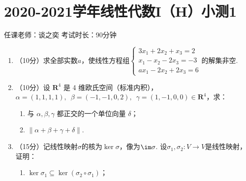 \section{2020-2021学年线性代数I（H）小测1}

\begin{center}
    任课老师：谈之奕\hspace{4em} 考试时长：90分钟
\end{center}

\begin{enumerate}
    \item （10分）求全部实数$a$，使线性方程组$\begin{cases}
        3x_1+2x_2+x_3=2 \\ x_1-x_2-2x_3=-3 \\ ax_1-2x_2+2x_3=6
    \end{cases}$的解集非空.
	\item （10分）设 $\mathbf{R}^4$ 是 4 维欧氏空间（标准内积），$\alpha=(1,1,1,1),\enspace\allowbreak\beta=(-1,-1,0,2),\enspace\allowbreak\gamma=(1,-1,0,0) \in \mathbf{R}^4$，求：
    \begin{enumerate}
        \item 与 $\alpha,\beta,\gamma$ 都正交的一个单位向量 $\delta$；

        \item $\lVert \alpha+\beta+\gamma+\delta \rVert$.
    \end{enumerate}
	\item （15分）记线性映射$\sigma$的核为$\ker\sigma$，像为$\im\sigma$. 设$\sigma_1,\sigma_2\colon V\to V$是线性映射，证明：
	\begin{enumerate}
        \item $\ker\sigma_1\subseteq\ker(\sigma_2\circ\sigma_1)$；


\end{enumerate}
\end{enumerate}
